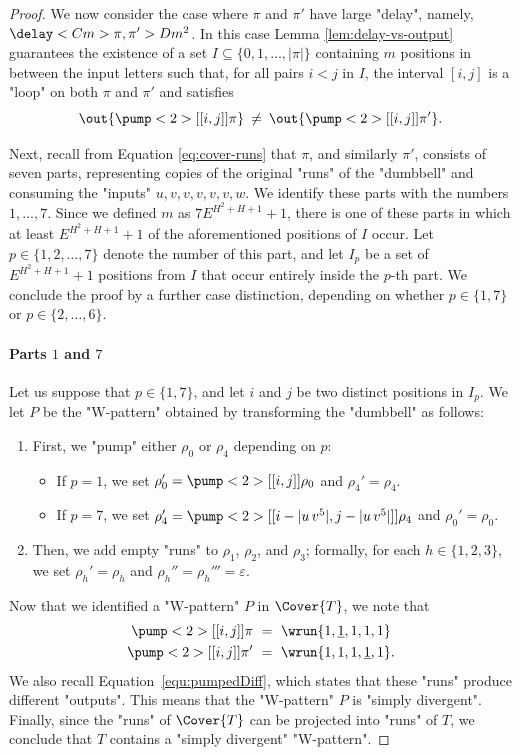 \documentclass{theoretics}
\begin{document}
\begin{proof}
We now consider the case where $\pi$ and $\pi'$
have large "delay", namely,
$\delay<C m>{\pi,\pi'} > D m^2$.
In this case Lemma \ref{lem:delay-vs-output} guarantees 
the existence of a set
$I \subseteq \{0, 1, \ldots, |\pi|\}$ containing 
$m$ positions in between the input letters such that,
for all pairs $i < j$ in $I$, the interval $[i,j]$
is a "loop" on both $\pi$ and $\pi'$ and satisfies
\begin{equation}\label{equ:pumpedDiff}
  \out{\pump<2>[[i,j]]{\pi}} 
  \:\neq\: 
  \out{\pump<2>[[i,j]]{\pi'}}.
\end{equation}

Next, recall from Equation \eqref{eq:cover-runs}
that $\pi$, and similarly $\pi'$, consists of seven parts,
representing copies of the original "runs" of the "dumbbell"
and consuming the "inputs" $u, v, v, v, v, v, w$.
We identify these parts with the numbers $1,\dots,7$.
Since we defined $m$ as $7E^{H^2 + H + 1}+1$,
there is one of these parts
in which at least $E^{H^2 + H + 1}+1$ of the 
aforementioned positions of $I$ occur.
Let $p \in \{1,2,\ldots,7\}$
denote the number of this part,
and let $I_p$ be a set of $E^{H^2 + H + 1}+1$ positions from $I$
that occur entirely inside the $p$-th part.
We conclude the proof by a further case distinction, 
depending on whether $p \in \{1,7\}$ or $p \in \{2,\dots,6\}$.

\paragraph{Parts $1$ and $7$}
Let us suppose that $p \in \{1,7\}$, 
and let $i$ and $j$ be two distinct positions in $I_p$.
We let $P$ be the "W-pattern" obtained by transforming 
the "dumbbell" as follows:
\begin{enumerate}
    \item First, we "pump" either $\rho_0$ or $\rho_4$
          depending on $p$:
    \begin{itemize}
        \item
        If $p = 1$, we set $\rho_0' = \pump<2>[[i,j]]{\rho_0}$
        and $\rho_4' = \rho_4$.
        \item
        If $p = 7$, we set $\rho_4' = \pump<2>[[i-|u\,v^5|,j-|u\,v^5|]]{\rho_4}$
        and $\rho_0' = \rho_0$.
    \end{itemize}
    \item Then, we add empty "runs" to $\rho_1$, $\rho_2$, and $\rho_3$;
    formally, for each $h \in \{1,2,3\}$, we set
    $\rho_h' = \rho_h$ and $\rho_h'' = \rho_h''' = \varepsilon$.
\end{enumerate}
Now that we identified a "W-pattern" $P$ in $\Cover{T}$, 
we note that 
\[
\begin{aligned}
  \pump<2>[[i,j]]{\pi}  &~=~ \wrun{1,\underline{1},1,1,1} \\
  \pump<2>[[i,j]]{\pi'} &~=~ \wrun{1,1,1,\underline{1},1}.
\end{aligned}
\]
We also recall Equation~\ref{equ:pumpedDiff}, which states 
that these "runs" produce different "outputs".
This means that the "W-pattern" $P$ is "simply divergent".
Finally, since the "runs" of $\Cover{T}$ can be projected 
into "runs" of $T$, we conclude that $T$ contains a 
"simply divergent" "W-pattern".



\end{proof}
\end{document}

